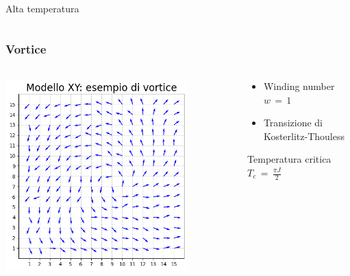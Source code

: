 \begin{frame}
\begin{columns}
\begin{column}{0.5\textwidth}
\begin{block}{Alta temperatura}
            \end{block}
        \end{column}
    \end{columns}

\end{frame}



\begin{frame}
    \frametitle{Vortice}
    \framesubtitle{}

    \begin{columns}
        \begin{column}{0.5\textwidth}
            \centering
            \includegraphics[width=0.8\textwidth]{Immagini/simXY/conf_vortice.png}
        \end{column}
    
        \begin{column}{0.5\textwidth}
            \begin{itemize}[itemsep=0.5em, label=$\diamond$]
                \item Winding number $w\,=\,1$
                \item Transizione di Kosterlitz-Thouless
            \end{itemize}
        \vspace{12pt}

        \begin{block}{Temperatura critica}
            \centering
            $T_c\,=\,\frac{\pi J}{2} $
        \end{block}
        \end{column}
    \end{columns}

\end{frame}



